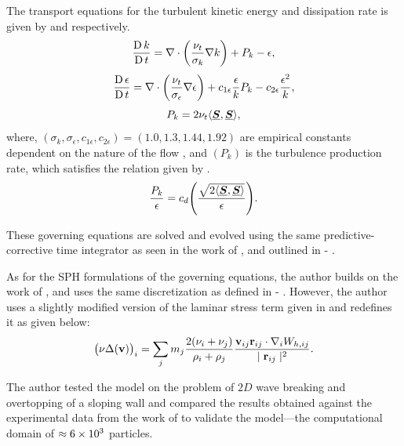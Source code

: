 The transport equations for the turbulent kinetic energy and dissipation rate is given by  and  respectively.
\begin{equation}
    \frac{\operatorname{D} k}{\operatorname{D} t} = \nabla \cdot \bigg( \frac{\nu_t}{\sigma_k} \nabla k \bigg) + P_k - \epsilon,
    \label{eq:Shao2006-k-transport-eq}
\end{equation}
\begin{equation}
    \frac{\operatorname{D} \epsilon}{\operatorname{D} t} = \nabla \cdot \bigg( \frac{\nu_t}{\sigma_{\epsilon}} \nabla \epsilon \bigg) + c_{1\epsilon} \frac{\epsilon}{k} P_k - c_{2\epsilon} \frac{\epsilon^2}{k},
    \label{eq:Shao2006-eps-transport-eq}
\end{equation}
\begin{equation}
    P_k = 2\nu_t \langle \underline{\bm{S}}, \underline{\bm{S}} \rangle,
    \label{eq:Shao2006-k-production-term}
\end{equation}
where, $(\sigma_k, \sigma_{\epsilon}, c_{1\epsilon}, c_{2\epsilon}) = (1.0, 1.3, 1.44, 1.92)$ are empirical constants dependent on the nature of the flow , and $(P_k)$ is the turbulence production rate, which satisfies the relation given by  \parencite{pope2000turbulent}.
\begin{equation}
    \frac{P_k}{\epsilon} = c_d \Bigg( \frac{\sqrt{2 \langle \underline{\bm{S}}, \underline{\bm{S}} \rangle}}{\epsilon} \Bigg).
    \label{eq:pope2000turbulent-k-production-relation}
\end{equation}

These governing equations are solved and evolved using the same predictive-corrective time integrator as seen in the work of \cite{Gotoh2004}, and outlined in  - .

As for the SPH formulations of the governing equations, the author builds on the work of \cite{Gotoh2004}, and uses the same discretization as defined in  - . However, the author uses a slightly modified version of the laminar stress term given in  and redefines it as given below:
\begin{equation}
    \big(\nu \Delta(\mathbf{v}) \big)_i = \sum_j m_j \frac{2 ( \nu_i + \nu_j ) }{ \rho_i + \rho_j }\frac{\mathbf{v}_{ij} \mathbf{r}_{ij} \cdot \nabla_{i} W_{h, ij}}{\mid \mathbf{r}_{ij} \mid^{2}}.
    \label{eq:Shao2006-vel-laplacian-sph}
\end{equation}

The author tested the model on the problem of $2D$ wave breaking and overtopping of a sloping wall and compared the results obtained against the experimental data from the work of \cite{li2004wave} to validate the model—the computational domain of $\approx 6 \times {10}^{3}$ particles.

